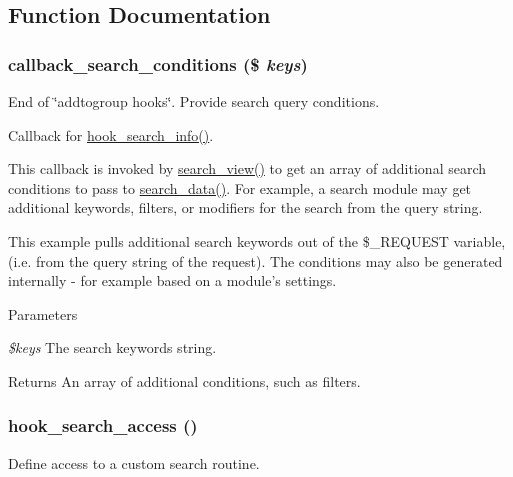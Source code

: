 \subsection{Function Documentation}
\hypertarget{group__search_gab59b17cb3637c3acccf3c73cd5c1195d}{
\subsubsection[{callback\_\-search\_\-conditions}]{\setlength{\rightskip}{0pt plus 5cm}callback\_\-search\_\-conditions (\$ {\em keys})}}
\label{group__search_gab59b17cb3637c3acccf3c73cd5c1195d}
End of \char`\"{}addtogroup hooks\char`\"{}. Provide search query conditions.

Callback for \hyperlink{group__search_ga37b761616f2cad4796891008f2b374f3}{hook\_\-search\_\-info()}.

This callback is invoked by \hyperlink{search_8pages_8inc_aa4798bb08a1df2c280b943182d53892e}{search\_\-view()} to get an array of additional search conditions to pass to \hyperlink{group__search_gadc45d10981f71a4d12879254b14c2c99}{search\_\-data()}. For example, a search module may get additional keywords, filters, or modifiers for the search from the query string.

This example pulls additional search keywords out of the \$\_\-REQUEST variable, (i.e. from the query string of the request). The conditions may also be generated internally -\/ for example based on a module's settings.


\begin{DoxyParams}{Parameters}
\item[{\em \$keys}]The search keywords string.\end{DoxyParams}
\begin{DoxyReturn}{Returns}
An array of additional conditions, such as filters. 
\end{DoxyReturn}
\hypertarget{group__search_gac49e6fd7370e65efeaf484ec992de1f0}{
\subsubsection[{hook\_\-search\_\-access}]{\setlength{\rightskip}{0pt plus 5cm}hook\_\-search\_\-access ()}}
\label{group__search_gac49e6fd7370e65efeaf484ec992de1f0}
Define access to a custom search routine.

